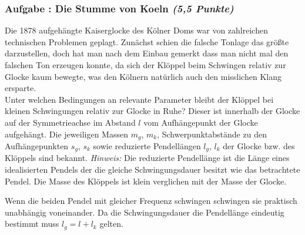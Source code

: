 \documentclass[12pt,a4paper]{article}
\newcommand{\hinweis}{\emph{Hinweis:} }
\newcounter{numlabel}
\newenvironment{problem}[2]{\stepcounter{numlabel} \vspace{1ex} \subsubsection*{Aufgabe \the\value{numlabel}: #1 \emph{(#2 Punkte)}} \renewcommand{\Currentlabel}{Aufgabe \the\value{numlabel}: #1}}{

}
\begin{document}
\begin{problem}{Die Stumme von Koeln}{5,5}
Die 1878 aufgehängte Kaiserglocke des Kölner Doms war von zahlreichen technischen Problemen geplagt. Zunächst schien die falsche Tonlage das größte darzustellen, doch hat man nach dem Einbau gemerkt dass man nicht mal den falschen Ton erzeugen konnte, da sich der Klöppel beim Schwingen relativ zur Glocke kaum bewegte, was den Kölnern natürlich auch den misslichen Klang ersparte.\\
Unter welchen Bedingungen an relevante Parameter bleibt der Klöppel bei kleinen Schwingungen relativ zur Glocke in Ruhe? Dieser ist innerhalb der Glocke auf der Symmetrieachse im Abstand $l$ vom Aufhängepunkt der Glocke aufgehängt. Die jeweiligen Massen $m_g$, $m_k$, Schwerpunktabstände zu den Aufhängepunkten $s_g$, $s_k$ sowie reduzierte Pendellängen $l_g$, $l_k$ der Glocke bzw. des Klöppels sind bekannt. \hinweis Die reduzierte Pendellänge ist die Länge eines idealisierten Pendels der die gleiche Schwingungsdauer besitzt wie das betrachtete Pendel. Die Masse des Klöppels ist klein verglichen  mit der Masse der Glocke.
\begin{solution}
Wenn die beiden Pendel mit gleicher Frequenz schwingen schwingen sie praktisch unabhängig voneinander. Da die Schwingungsdauer die Pendellänge eindeutig bestimmt muss $l_g = l + l_k$ gelten.
\end{solution}
\end{problem}
\end{document}
